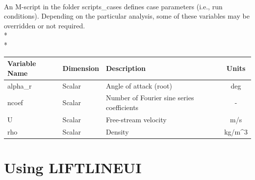 \documentclass{article}
\begin{document}
\paragraph{}
An M-script in the folder scripts\_cases defines case parameters
(i.e., run conditions).  Depending on the particular analysis, some of
these variables may be overridden or not required.\\*\\*
\begin{tabular}{|l|l|p{2.5in}|c|}
  \hline
  \textbf{Variable Name} &
  \textbf{Dimension} &
  \textbf{Description} &
  \textbf{Units}  
  \\
  \hline
  alpha\_r & Scalar &
  Angle of attack (root) &
  deg
  \\
  \hline
  ncoef & Scalar &
  Number of Fourier sine series coefficients &
  -
  \\
  \hline
  U & Scalar &
  Free-stream velocity &
  m/s
  \\
  \hline
  rho & Scalar &
  Density &
  kg/m\^{}3
  \\
  \hline
\end{tabular}
\section{Using LIFTLINEUI}
\end{document}

